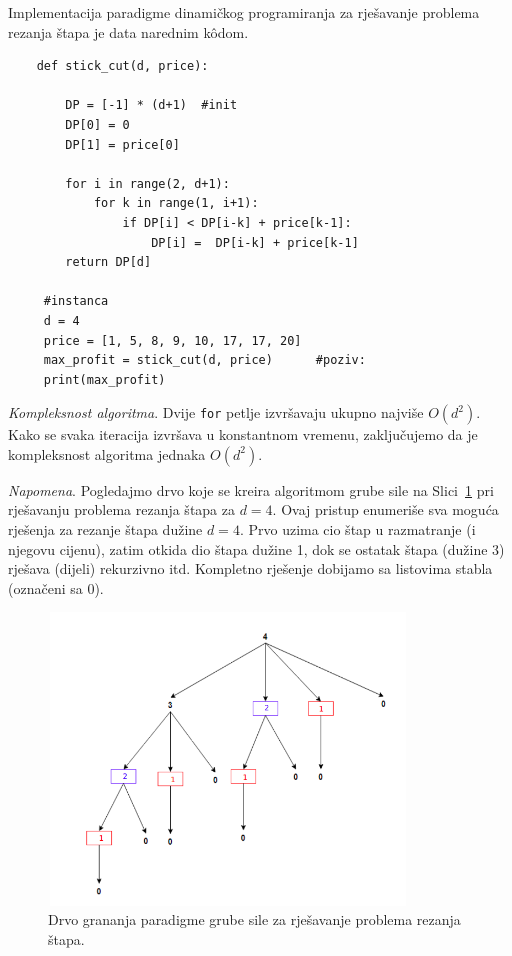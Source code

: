  Implementacija paradigme dinamičkog programiranja za rješavanje problema  rezanja štapa je data narednim k\^odom. 
 
 \begin{verbatim}
	def stick_cut(d, price):

		DP = [-1] * (d+1)  #init
		DP[0] = 0
		DP[1] = price[0]

		for i in range(2, d+1):
			for k in range(1, i+1):
				if DP[i] < DP[i-k] + price[k-1]: 
					DP[i] =  DP[i-k] + price[k-1]
		return DP[d]       
     
     #instanca
     d = 4
     price = [1, 5, 8, 9, 10, 17, 17, 20] 
     max_profit = stick_cut(d, price)      #poziv:
     print(max_profit)
 \end{verbatim}

\textit{Kompleksnost algoritma}. Dvije \texttt{for} petlje izvršavaju ukupno najviše $O(d^2)$. Kako se svaka iteracija izvršava u konstantnom vremenu, zaključujemo da je kompleksnost algoritma jednaka $O(d^2)$.

\textit{Napomena}. Pogledajmo drvo koje se kreira algoritmom grube sile na Slici~\ref{fig:brute-force-stick-cut}  pri rješavanju problema rezanja štapa za $d=4$. Ovaj pristup enumeriše sva moguća rješenja za rezanje štapa dužine $d=4$. Prvo uzima cio štap u razmatranje (i njegovu cijenu), zatim otkida dio štapa dužine 1, dok se ostatak štapa (dužine 3) rješava (dijeli) rekurzivno itd. Kompletno rješenje dobijamo sa listovima stabla (označeni sa 0). 
\begin{center}
	\begin{figure}[H]
		\centering
		\includegraphics[width=270pt,height=220pt]{slike/brute-force-cutting-stick.png}
		
		\caption{Drvo grananja paradigme grube sile za rješavanje problema rezanja štapa.}\label{fig:brute-force-stick-cut}
	\end{figure}
\end{center}



